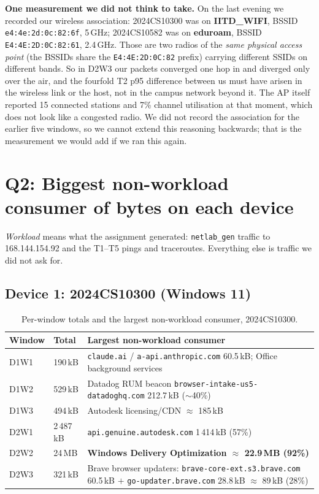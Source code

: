 \textbf{One measurement we did not think to take.} On the last evening we recorded our wireless
association: 2024CS10300 was on \textbf{IITD\_WIFI}, BSSID \texttt{e4:4e:2d:0c:82:6f}, 5\,GHz;
2024CS10582 was on \textbf{eduroam}, BSSID \texttt{E4:4E:2D:0C:82:61}, 2.4\,GHz. Those are two
radios of the \emph{same physical access point} (the BSSIDs share the
\texttt{E4:4E:2D:0C:82} prefix) carrying different SSIDs on different bands. So in D2W3 our
packets converged one hop in and diverged only over the air, and the fourfold T2 p95 difference
between us must have arisen in the wireless link or the host, not in the campus network beyond
it. The AP itself reported 15 connected stations and 7\% channel utilisation at that moment,
which does not look like a congested radio. We did not record the association for the earlier
five windows, so we cannot extend this reasoning backwards; that is the measurement we would add
if we ran this again.

\section{Q2: Biggest non-workload consumer of bytes on each device}

\emph{Workload} means what the assignment generated: \texttt{netlab\_gen} traffic to
168.144.154.92 and the T1--T5 pings and traceroutes. Everything else is traffic we did not ask
for.

\subsection{Device 1: 2024CS10300 (Windows 11)}

\begin{table}[H]
\centering
\caption{Per-window totals and the largest non-workload consumer, 2024CS10300.}
\label{tab:b1bg10300}
\footnotesize
\begin{tabular}{@{}ll>{\raggedright\arraybackslash}p{8.2cm}@{}}
\toprule
Window & Total & Largest non-workload consumer \\
\midrule
D1W1 & 190\,kB & \texttt{claude.ai} / \texttt{a-api.anthropic.com} 60.5\,kB; Office background services \\
D1W2 & 529\,kB & Datadog RUM beacon \texttt{browser-intake-us5-\allowbreak datadoghq.com} 212.7\,kB ($\sim$40\%) \\
D1W3 & 494\,kB & Autodesk licensing/CDN $\approx$ 185\,kB \\
D2W1 & 2\,487\,kB & \texttt{api.genuine.autodesk.com} 1\,414\,kB (57\%) \\
D2W2 & 24\,MB & \textbf{Windows Delivery Optimization $\approx$ 22.9\,MB (92\%)} \\
D2W3 & 321\,kB & Brave browser updaters: \texttt{brave-core-ext.s3.brave.com} 60.5\,kB $+$ \texttt{go-updater.brave.com} 28.8\,kB $\approx$ 89\,kB (28\%) \\
\bottomrule
\end{tabular}
\end{table}

